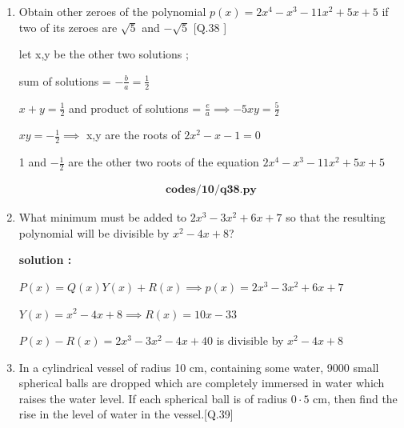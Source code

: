 \begin{enumerate}[label=\thesubsection.\arabic*, ref=\thesubsection.\theenumi]
\begin{center}
\end{center}
let distance from point to lower point of pedestal be x ; 

$tan 45^\circ = \frac{BC}{AB}=BC=AB $

 $tan 60^\circ= \frac{BD}{AB}=\sqrt{3}\implies AB =\frac{1.6}{\sqrt{3}}$

 height of pedestal =$\frac{1.6}{\sqrt{3}}$

 \item  Obtain other zeroes of the polynomial $p(x) = 2x^{4} - x^{3} - 11x^{2} + 5x + 5$ if two of its zeroes are $\sqrt{5}$ and $-\sqrt{5}$
[Q.38 ]

 \solution

 let x,y be the other two solutions ;

 sum of solutions = $-\frac{b}{a}= \frac{1}{2}$

 $x+y=\frac{1}{2}$  and product of solutions = $\frac{e}{a} \implies  -5xy= \frac{5}{2}$

 $xy=-\frac{1}{2} \implies$ x,y are the roots of  $ 2x^2-x-1 =0 $


1 and $-\frac{1}{2}$ are the other two roots of the equation $2x^4-x^3-11x^2+5x+5$

\begin{align}
	\textbf{codes/10/q38.py}
\end{align}
\item 

What minimum must be added to $2x^{3} - 3x^{2} + 6x + 7$ so that the resulting polynomial will be divisible by $x^{2} - 4x + 8$?   

\textbf{solution :}

$P(x)= Q(x)Y(x)+R(x) \implies p(x)=2x^3-3x^2+6x+7$ 

$Y(x)= x^2-4x+8  \implies R(x)= 10x-33$

$P(x)- R(x)= 2x^3-3x^2 -4x+40  $ is divisible by $ x^2-4x+8$

  \item In a cylindrical vessel of radius 10 cm, containing some water, 9000 small spherical balls are dropped which are completely immersed in water which raises the water level. If each spherical ball is of radius $0\cdot5\text{ cm}$, then find the rise in the level of water in the vessel.[Q.39]


\end{enumerate}
